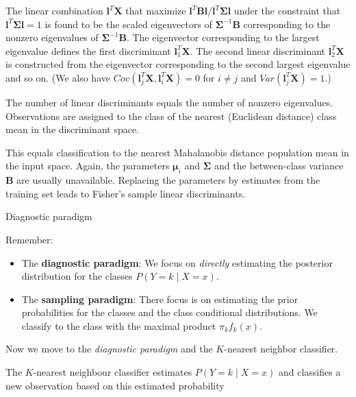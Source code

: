 \documentclass[10pt,ignorenonframetext,]{beamer}
\begin{document}
\begin{frame}

The linear combination \(\boldsymbol{l}^{T}\boldsymbol{X}\) that
maximize
\({\boldsymbol{l}^{T}\boldsymbol{B}\boldsymbol{l}}/{\boldsymbol{l}^{T}\boldsymbol{\Sigma}\boldsymbol{l}}\)
under the constraint that
\(\boldsymbol{l}^{T}\boldsymbol{\Sigma}\boldsymbol{l}=1\) is found to be
the scaled eigenvectors of \(\boldsymbol{\Sigma}^{-1}\boldsymbol{B}\)
corresponding to the nonzero eigenvalues of
\(\boldsymbol{\Sigma}^{-1}\boldsymbol{B}\). The eigenvector
corresponding to the largest eigenvalue defines the first discriminant
\(\boldsymbol{l}_{1}^{T}\boldsymbol{X}\). The second linear discriminant
\(\boldsymbol{l}_{2}^{T}\boldsymbol{X}\) is constructed from the
eigenvector corresponding to the second largest eigenvalue and so on.
(We also have
\(Cov(\boldsymbol{l}_{j}^{T}\boldsymbol{X},\boldsymbol{l}_{i}^{T}\boldsymbol{X})=0\)
for \(i \ne j\) and \(Var(\boldsymbol{l}_{j}^{T}\boldsymbol{X})=1\).)

\end{frame}

\begin{frame}

The number of linear discriminants equals the number of nonzero
eigenvalues. Observations are assigned to the class of the nearest
(Euclidean distance) class mean in the discriminant space.

This equals classification to the nearest Mahalanobis distance
population mean in the input space. Again, the parameters
\(\boldsymbol{\mu}_{i}\) and \(\boldsymbol{\Sigma}\) and the
between-class variance \(\boldsymbol{B}\) are usually unavailable.
Replacing the parameters by estimates from the training set leads to
Fisher's sample linear discriminants.

\end{frame}

\begin{frame}{Diagnostic paradigm}

Remember:

\begin{itemize}
\item
  The \textbf{diagnostic paradigm}: We focus on \emph{directly}
  estimating the posterior distribution for the classes
  \(P(Y=k \mid X=x)\).
\item
  The \textbf{sampling paradigm}: There focus is on estimating the prior
  probabilities for the classes and the class conditional distributions.
  We classify to the class with the maximal product \(\pi_k f_k(x)\).
\end{itemize}

Now we move to the \emph{diagnostic paradigm} and the \(K\)-nearest
neighbor classifier.

The \(K\)-nearest neighbour classifier estimates \(P(Y=k \mid X=x)\) and
classifies a new observation based on this estimated probability

\end{frame}
\end{document}
